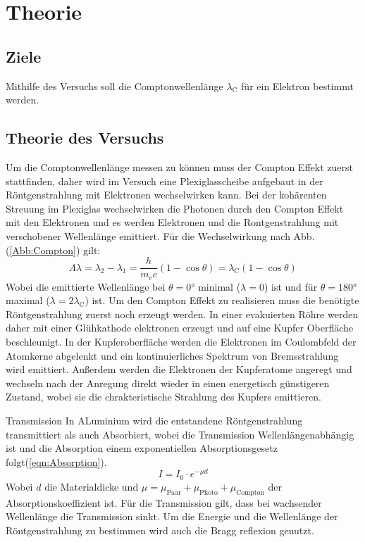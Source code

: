 \section{Theorie}
\label{sec:theorie}
\subsection{Ziele}
Mithilfe des Versuchs soll die Comptonwellenlänge $\lambda_{\text{C}}$ für ein Elektron bestimmt werden.
\subsection{Theorie des Versuchs}
Um die Comptonwellenlänge messen zu können muss der Compton Effekt zuerst stattfinden, 
daher wird im Versuch eine Plexiglasscheibe aufgebaut in der Röntgenstrahlung mit Elektronen wechselwirken kann.
Bei der kohärenten Streuung im Plexiglas wechselwirken die Photonen durch den Compton Effekt mit den Elektronen
und es werden Elektronen und die Rontgenstrahlung mit verschobener Wellenlänge emittiert.
Für die Wechselwirkung nach Abb. (\ref{Abb:Compton}) gilt:
\begin{equation}
    \Lambda \lambda = \lambda_2 - \lambda_1
                    = \frac{h}{m_e c}\left( 1- \cos \theta \right) 
                    = \lambda_{\text{C}} \left( 1- \cos \theta \right) \label{eqn:wellenlänge} 
\end{equation}
Wobei die emittierte Wellenlänge bei $\theta = 0°$ minimal ($\lambda = 0$) ist und für $\theta = 180°$ maximal ($\lambda = 2\lambda_{\text{C}}$) ist.
Um den Compton Effekt zu realisieren muss die benötigte Röntgenstrahlung zuerst noch erzeugt werden.
In einer evakuierten Röhre werden daher mit einer Glühkathode elektronen erzeugt und auf eine Kupfer Oberfläche beschleunigt.
In der Kupferoberfläche werden die Elektronen im Coulombfeld der Atomkerne abgelenkt und ein kontinuierliches Spektrum von Bremsstrahlung wird emittiert.
Außerdem werden die Elektronen der Kupferatome angeregt und wechseln nach der Anregung direkt wieder in einen energetisch günstigeren Zustand, wobei sie die chrakteristische Strahlung des Kupfers emittieren.

Transmission 
In ALuminium wird die entstandene Röntgenstrahlung transmittiert als auch Absorbiert, wobei die Transmission Wellenlängenabhängig ist und die Absorption einem exponentiellen Absorptionsgesetz folgt(\ref{eqn:Absorption}).
\begin{equation}
    I = I_0 \cdot e^{-\mu d} \label{eqn:Absorption}
\end{equation}
Wobei $d$ die Materialdicke und $\mu = \mu_{\text{Paar}}+\mu_{\text{Photo}}+\mu_{\text{Compton}}$ der Absorptionskoeffizient ist.
Für die Transmission gilt, dass bei wachsender Wellenlänge die Transmission sinkt.
Um die Energie und die Wellenlänge der Röntgenstrahlung zu bestimmen wird auch die Bragg reflexion genutzt.


